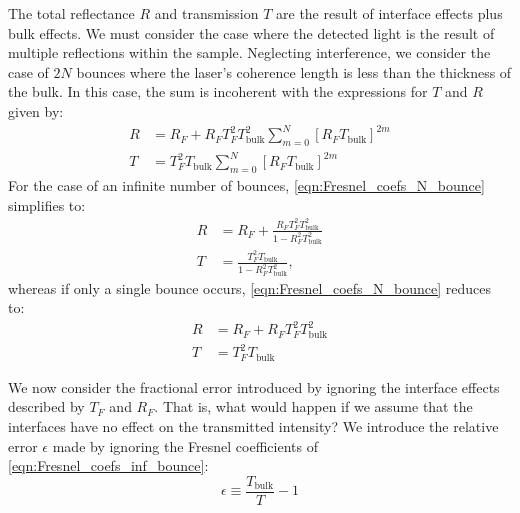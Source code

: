 The total reflectance $R$ and transmission $T$ are the result of interface effects plus bulk effects. We must consider the case where the detected light is the result of multiple reflections within the sample. Neglecting interference, we consider the case of $2N$ bounces where the laser's coherence length is less than the thickness of the bulk. In this case, the sum is incoherent with the expressions for $T$ and $R$ given by:
\begin{equation}
\begin{aligned}
R &= R_F + R_F T_F^2 T_{\text{bulk}}^2 \sum_{m=0}^{N} \left[ R_F T_{\text{bulk}} \right]^{2m} \\
T &= T_F^2 T_{\text{bulk}} \sum_{m=0}^{N} \left[ R_F T_{\text{bulk}} \right]^{2m}
\end{aligned}
\label{eqn:Fresnel_coefs_N_bounce}
\end{equation}
For the case of an infinite number of bounces, \cref{eqn:Fresnel_coefs_N_bounce} simplifies to:
\begin{equation}
\begin{aligned}
R &= R_F + \frac{R_F T_F^2 T_{\text{bulk}}^2}{1-R_F^2 T_{\text{bulk}}^2} \\
T &= \frac{T_F^2 T_{\text{bulk}}}{1-R_F^2 T_{\text{bulk}}^2},
\end{aligned}
\label{eqn:Fresnel_coefs_inf_bounce}
\end{equation}
whereas if only a single bounce occurs, \cref{eqn:Fresnel_coefs_N_bounce} reduces to:
\begin{equation}
\begin{aligned}
R &= R_F + R_F T_F^2 T_{\text{bulk}}^2 \\
T &= T_F^2 T_{\text{bulk}}
\end{aligned}
\label{eqn:Fresnel_coefs_1_bounce}
\end{equation}

We now consider the fractional error introduced by ignoring the interface effects described by $T_F$ and $R_F$. That is, what would happen if we assume that the interfaces have no effect on the transmitted intensity? We introduce the relative error $\epsilon$ made by ignoring the Fresnel coefficients of \cref{eqn:Fresnel_coefs_inf_bounce}:
\begin{equation}
\epsilon \equiv \frac{T_{\text{bulk}}}{T} - 1
\label{eqn:Fresnel_rel_err}
\end{equation}

